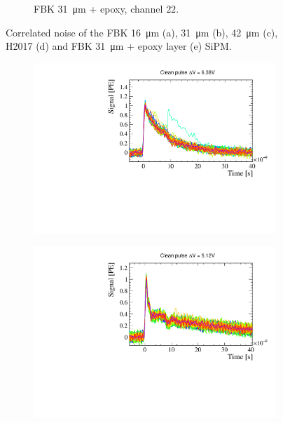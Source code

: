 \begin{figure}[htbp]
\begin{subfigure}{0.48\textwidth}
    \caption{FBK \SI{31}{\micro m} + epoxy, channel $22$.}
  \end{subfigure}
\caption{Correlated noise of the FBK \SI{16}{\micro m} (a), \SI{31}{\micro m} (b), \SI{42}{\micro m} (c), H2017 (d) and FBK \SI{31}{\micro m} + epoxy layer (e) SiPM. }
\label{fig:correlated noises + epoxy}
\end{figure}

\begin{figure}[htbp]
    \centering
       \begin{subfigure}{0.48\textwidth}
        \includegraphics[width=1\linewidth]{gfx/plots/WA/16/clwf16.pdf}
        \caption{}
      \end{subfigure}
      \hfill
       \begin{subfigure}{0.48\textwidth}
        \includegraphics[width=1\linewidth]{gfx/plots/WA/31/clwf31.pdf}

\end{subfigure}
\end{figure}
